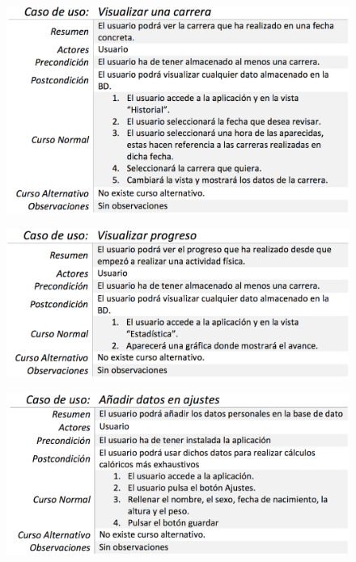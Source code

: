 \documentclass[a4paper, 11pt]{article}
\begin{document}
\begin{itemize}
            \begin{figure}[H]
              \centering
              \includegraphics[width=1\textwidth]{visualizar-una-carrera}
            \end{figure}

            \begin{figure}[H]
              \centering
              \includegraphics[width=1\textwidth]{visualizar-progreso}
            \end{figure}

            \begin{figure}[H]
              \centering
              \includegraphics[width=1\textwidth]{anadir-datos-en-ajustes}
            \end{figure}


\end{itemize}
\end{document}
